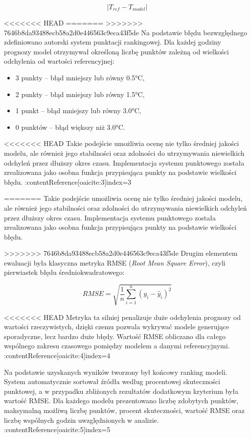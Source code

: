 \documentclass[a4paper,12pt]{article}
\begin{document}
\[
|T_{ref} - T_{model}|
\]

<<<<<<< HEAD
=======
\noindent
>>>>>>> 7646b8da93488ecb58a2d0e446563c9eca43f5de
Na podstawie błędu bezwzględnego zdefiniowano autorski system punktacji rankingowej. Dla każdej godziny prognozy model otrzymywał określoną liczbę punktów zależną od wielkości odchylenia od wartości referencyjnej:

\begin{itemize}
    \item 3 punkty -- błąd mniejszy lub równy 0.5°C,
    \item 2 punkty -- błąd mniejszy lub równy 1.5°C,
    \item 1 punkt -- błąd mniejszy lub równy 3.0°C,
    \item 0 punktów -- błąd większy niż 3.0°C.
\end{itemize}

<<<<<<< HEAD
Takie podejście umożliwia ocenę nie tylko średniej jakości modelu, ale również jego stabilności oraz zdolności do utrzymywania niewielkich odchyleń przez dłuższy okres czasu. Implementacja systemu punktowego została zrealizowana jako osobna funkcja przypisująca punkty na podstawie wielkości błędu. :contentReference[oaicite:3]{index=3}

=======
\noindent
Takie podejście umożliwia ocenę nie tylko średniej jakości modelu, ale również jego stabilności oraz zdolności do utrzymywania niewielkich odchyleń przez dłuższy okres czasu. Implementacja systemu punktowego została zrealizowana jako osobna funkcja przypisująca punkty na podstawie wielkości błędu. 

\noindent
>>>>>>> 7646b8da93488ecb58a2d0e446563c9eca43f5de
Drugim elementem ewaluacji była klasyczna metryka RMSE (\textit{Root Mean Square Error}), czyli pierwiastek błędu średniokwadratowego:

\[
RMSE = \sqrt{\frac{1}{n}\sum_{i=1}^{n}(y_i - \hat{y}_i)^2}
\]

<<<<<<< HEAD
Metryka ta silniej penalizuje duże odchylenia prognozy od wartości rzeczywistych, dzięki czemu pozwala wykrywać modele generujące sporadyczne, lecz bardzo duże błędy. Wartość RMSE obliczano dla całego wspólnego zakresu czasowego pomiędzy modelem a danymi referencyjnymi. :contentReference[oaicite:4]{index=4}

Na podstawie uzyskanych wyników tworzony był końcowy ranking modeli. System automatycznie sortował źródła według procentowej skuteczności punktowej, a w przypadku zbliżonych rezultatów dodatkowym kryterium była wartość RMSE. Dla każdego modelu prezentowano liczbę zdobytych punktów, maksymalną możliwą liczbę punktów, procent skuteczności, wartość RMSE oraz liczbę wspólnych godzin uwzględnionych w analizie. :contentReference[oaicite:5]{index=5}
\end{document}
